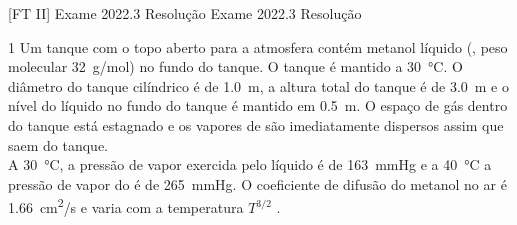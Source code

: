 \documentclass[\mainfilename]{subfiles}
\begin{document}

[FT II]
{Exame 2022.3 Resolução} %
{Exame 2022.3 Resolução} %

\begin{questionBox}1{ %
    Um tanque com o topo aberto para a atmosfera contém metanol líquido (, peso molecular \qty*{32}{\g/\mole}) no fundo do tanque. O tanque é mantido a \qty*{30}{\celsius}. O diâmetro do tanque cilíndrico é de \qty*{1.0}{\m}, a altura total do tanque é de \qty*{3.0}{\m} e o nível do líquido no fundo do tanque é mantido em \qty*{0.5}{\m}. O espaço de gás dentro do tanque está estagnado e os vapores de  são imediatamente dispersos assim que saem do tanque.\\[2ex]A \qty*{30}{\celsius}, a pressão de vapor exercida pelo  líquido é de \qty*{163}{\mmHg} e a \qty*{40}{\celsius} a pressão de vapor do  é de \qty*{265}{\mmHg}. O coeficiente de difusão do metanol no ar é \qty*{1.66}{\cm^2/\s} e varia com a temperatura \(T^{3/2}\) .
} %
\end{questionBox}
\end{document}
